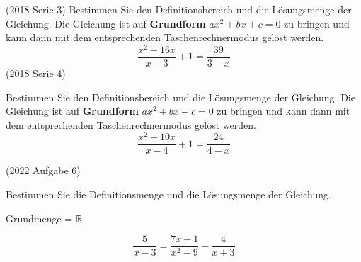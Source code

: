 (2018 Serie 3)
Bestimmen Sie den Definitionsbereich und die Lösungsmenge der Gleichung.
Die Gleichung ist auf \textbf{Grundform} $ax^2 + bx + c = 0$ zu bringen und kann dann mit
dem entsprechenden Taschenrechnermodus gelöst werden.
$$\frac{x^2-16x}{x-3} + 1 = \frac{39}{3-x}$$
(2018 Serie 4)

Bestimmen Sie den Definitionsbereich und die Lösungsmenge der Gleichung.
Die Gleichung ist auf \textbf{Grundform}
$ax^2 + bx + c = 0$ zu bringen und kann dann
mit dem entsprechenden Taschenrechnermodus gelöst werden.
$$\frac{x^2-10x}{x-4} + 1 = \frac{24}{4-x}$$


(2022 Aufgabe 6)

Bestimmen Sie die Definitionsmenge und die Lösungsmenge der Gleichung.

Grundmenge = $\mathbb{R}$


$$\frac5{x-3}   = \frac{7x-1}{x^2-9}   -    \frac4{x+3}$$



